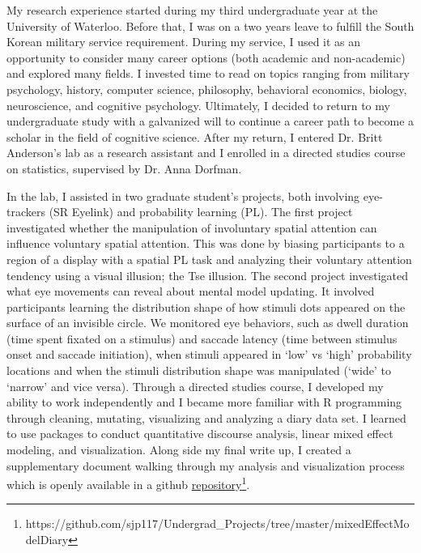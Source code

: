\documentclass[12pt]{article}
\begin{document}
My research experience started during my third undergraduate year at the University of Waterloo. Before that, I was on a two years leave to fulfill the South Korean military service requirement. During my service, I used it as an opportunity to consider many career options (both academic and non-academic) and explored many fields. I invested time to read on topics ranging from military psychology, history, computer science, philosophy, behavioral economics, biology, neuroscience, and cognitive psychology. Ultimately, I decided to return to my undergraduate study with a galvanized will to continue a career path to become a scholar in the field of cognitive science. After my return, I entered Dr. Britt Anderson’s lab as a research assistant and I enrolled in a directed studies course on statistics, supervised by Dr. Anna Dorfman.

In the lab, I assisted in two graduate student's projects, both involving eye-trackers (SR Eyelink) and probability learning (PL). The first project investigated whether the manipulation of involuntary spatial attention can influence voluntary spatial attention. This was done by biasing participants to a region of a display with a spatial PL task and analyzing their voluntary attention tendency using a visual illusion; the Tse illusion. The second project investigated what eye movements can reveal about mental model updating. It involved participants learning the distribution shape of how stimuli dots appeared on the surface of an invisible circle. We monitored eye behaviors, such as dwell duration (time spent fixated on a stimulus) and saccade latency (time between stimulus onset and saccade initiation), when stimuli appeared in `low' vs `high' probability locations and when the stimuli distribution shape was manipulated (`wide' to `narrow' and vice versa). Through a directed studies course, I developed my ability to work independently and I became more familiar with R programming through cleaning, mutating, visualizing and analyzing a diary data set. I learned to use packages to conduct quantitative discourse analysis, linear mixed effect modeling, and visualization. Along side my final write up, I created a supplementary document walking through my analysis and visualization process which is openly available in a github \href{https://github.com/sjp117/Undergrad_Projects/tree/master/mixedEffectModelDiary}{repository}\footnote{https://github.com/sjp117/Undergrad\_Projects/tree/master/mixedEffectModelDiary}.
\end{document}
